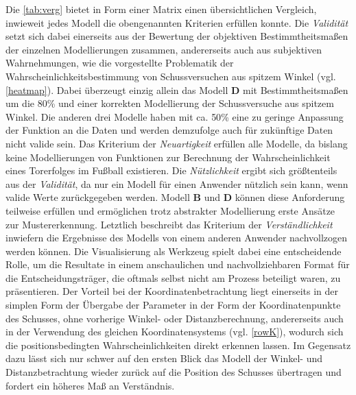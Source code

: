 Die \vref{tab:verg} bietet in Form einer Matrix einen übersichtlichen Vergleich, inwieweit jedes Modell die obengenannten Kriterien erfüllen konnte. Die \textit{Validität} setzt sich dabei einerseits aus der Bewertung der objektiven Bestimmtheitsmaßen der einzelnen Modellierungen zusammen, andererseits auch aus subjektiven Wahrnehmungen, wie die vorgestellte Problematik der Wahrscheinlichkeitsbestimmung von Schussversuchen aus spitzem Winkel (vgl. \vref{heatmap}). Dabei überzeugt einzig allein das Modell \textbf{D} mit Bestimmtheitsmaßen um die \textsf{80}\% und einer korrekten Modellierung der Schussversuche aus spitzem Winkel. Die anderen drei Modelle haben mit ca. \textsf{50}\% eine zu geringe Anpassung der Funktion an die Daten und werden demzufolge auch für zukünftige Daten nicht valide sein. Das Kriterium der \textit{Neuartigkeit} erfüllen alle Modelle, da bislang keine Modellierungen von Funktionen zur Berechnung der Wahrscheinlichkeit eines Torerfolges im Fußball existieren. Die \textit{Nützlichkeit} ergibt sich größtenteils aus der \textit{Validität}, da nur ein Modell für einen Anwender nützlich sein kann, wenn valide Werte zurückgegeben werden. Modell \textbf{B} und \textbf{D} können diese Anforderung teilweise erfüllen und ermöglichen trotz abstrakter Modellierung erste Ansätze zur Mustererkennung. Letztlich beschreibt das Kriterium der \textit{Verständlichkeit} inwiefern die Ergebnisse des Modells von einem anderen Anwender nachvollzogen werden können. Die Visualisierung als Werkzeug spielt dabei eine entscheidende Rolle, um die Resultate in einem anschaulichen und nachvollziehbaren Format für die Entscheidungsträger, die oftmals selbst nicht am Prozess beteiligt waren, zu präsentieren. Der Vorteil bei der Koordinatenbetrachtung liegt einerseits in der simplen Form der Übergabe der Parameter in der Form der Koordinatenpunkte des Schusses, ohne vorherige Winkel- oder Distanzberechnung, andererseits auch in der Verwendung des gleichen Koordinatensystems (vgl. \vref{rowK}), wodurch sich die positionsbedingten Wahrscheinlichkeiten direkt erkennen lassen. Im Gegensatz dazu lässt sich nur schwer auf den ersten Blick das Modell der Winkel- und Distanzbetrachtung wieder zurück auf die Position des Schusses übertragen und fordert ein höheres Maß an Verständnis.

